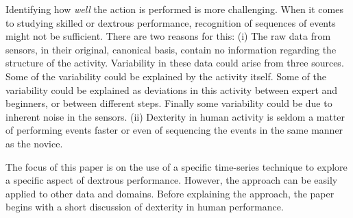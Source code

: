 \documentclass{sigchi}
\begin{document}
Identifying how \textit{well} the action is performed is more challenging. 
When it comes to studying skilled or dextrous performance, recognition of sequences of events 
might not be sufficient. 
There are two reasons for this:
(i) The raw data from sensors, in their original, canonical basis, contain no information regarding the structure of
the activity. Variability in these data could arise from three sources. Some of the variability could be explained
by the activity itself. Some of the variability could be explained as deviations in this activity
between expert and beginners, or between different steps. Finally some variability could be due to 
inherent noise in the sensors.
(ii) Dexterity in human activity is seldom a matter of performing events 
faster or even of sequencing the events in the same manner as the novice. 



The focus of this paper is on the use of a specific time-series technique to explore a specific aspect of 
dextrous performance. However, the approach can be easily applied to other data and domains. 
Before explaining the approach, the paper begins with a short discussion of dexterity in human performance. 
\end{document}
